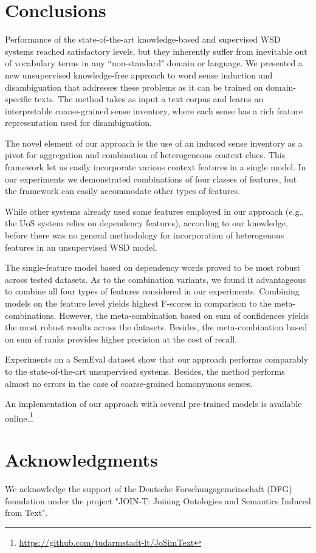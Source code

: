 \documentclass[11pt]{article}
\begin{document}
\section{Conclusions}

Performance of the state-of-the-art knowledge-based and supervised WSD systems reached satisfactory levels, but they inherently suffer from inevitable out of vocabulary terms in any ``non-standard" domain or language. We presented a new unsupervised knowledge-free approach to word sense induction and disambiguation that addresses these problems as it can be trained on domain-specific texts. The method takes as input a text corpus and learns an interpretable coarse-grained sense inventory, where each sense has a rich feature representation used for disambiguation. 

The novel element of our approach is the use of an induced sense inventory as a pivot for aggregation and combination of heterogeneous context clues. This framework let us easily incorporate various context features in a single model. In our experiments we demonstrated combinations of four classes of features, but the framework can easily accommodate other types of features. 

While other systems already used some features employed in our approach  (e.g., the UoS system relies on dependency features), according to our knowledge, before there was no general methodology for incorporation of heterogenous features in an unsupervised WSD model. 
 
The single-feature model based on dependency words proved to be most robust across tested datasets. As to the combination variants, we found it advantageous to combine all four types of features considered in our experiments. Combining models on the feature level yields highest F-scores in comparison to the meta-combinations. However, the meta-combination based on sum of confidences yields  the most robust results across the datasets. Besides, the meta-combination based on sum of ranks provides higher precision at the cost of recall. 


Experiments on a SemEval dataset show that our approach performs comparably to the state-of-the-art unsupervised systems. Besides, the method performs almost no errors in the case of coarse-grained homonymous senses.  

An implementation of our approach with several pre-trained models is available online.\footnote{\url{https://github.com/tudarmstadt-lt/JoSimText}}


\section*{Acknowledgments}

We acknowledge the support of the Deutsche For\-schungs\-gemeinschaft (DFG) foundation under the project "JOIN-T: Joining Ontologies and Semantics Induced from Text".  



\end{document}
